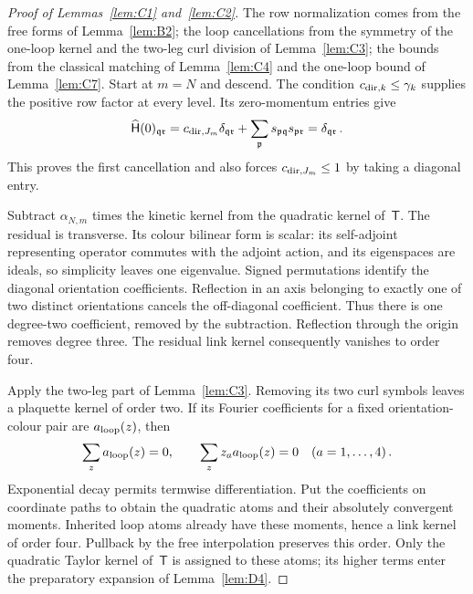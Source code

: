 \begin{proof}[Proof of Lemmas~\ref{lem:C1} and~\ref{lem:C2}]
The row normalization comes from the free forms of Lemma~\ref{lem:B2}; the loop cancellations from the symmetry of the one-loop kernel and the two-leg curl division of Lemma~\ref{lem:C3}; the bounds from the classical matching of Lemma~\ref{lem:C4} and the one-loop bound of Lemma~\ref{lem:C7}. Start at $m=N$ and descend. The condition $c_{{\rm dir},k}\le\gamma_k$ supplies the positive row factor at every level. Its zero-momentum entries give
\begin{equation*}
\widehat{\mathsf H}(0)_{\mathfrak q\mathfrak r}
=c_{{\rm dir},J_m}\delta_{\mathfrak q\mathfrak r}
+\sum_{\mathfrak p}s_{\mathfrak p\mathfrak q}s_{\mathfrak p\mathfrak r}
=\delta_{\mathfrak q\mathfrak r}\,.
\end{equation*}
This proves the first cancellation and also forces $c_{{\rm dir},J_m}\le1$ by taking a diagonal entry.

Subtract $\alpha_{N,m}$ times the kinetic kernel from the quadratic kernel of~$\mathsf T$. The residual is transverse. Its colour bilinear form is scalar: its self-adjoint representing operator commutes with the adjoint action, and its eigenspaces are ideals, so simplicity leaves one eigenvalue. Signed permutations identify the diagonal orientation coefficients. Reflection in an axis belonging to exactly one of two distinct orientations cancels the off-diagonal coefficient. Thus there is one degree-two coefficient, removed by the subtraction. Reflection through the origin removes degree three. The residual link kernel consequently vanishes to order four.

Apply the two-leg part of Lemma~\ref{lem:C3}. Removing its two curl symbols leaves a plaquette kernel of order two. If its Fourier coefficients for a fixed orientation-colour pair are $a_{\rm loop}(z)$, then
\begin{equation*}
\sum_z a_{\rm loop}(z)=0,\qquad\sum_z z_a a_{\rm loop}(z)=0\quad(a=1,\ldots,4)\,.
\end{equation*}
Exponential decay permits termwise differentiation. Put the coefficients on coordinate paths to obtain the quadratic atoms and their absolutely convergent moments. Inherited loop atoms already have these moments, hence a link kernel of order four. Pullback by the free interpolation preserves this order. Only the quadratic Taylor kernel of~$\mathsf T$ is assigned to these atoms; its higher terms enter the preparatory expansion of Lemma~\ref{lem:D4}.


\end{proof}
